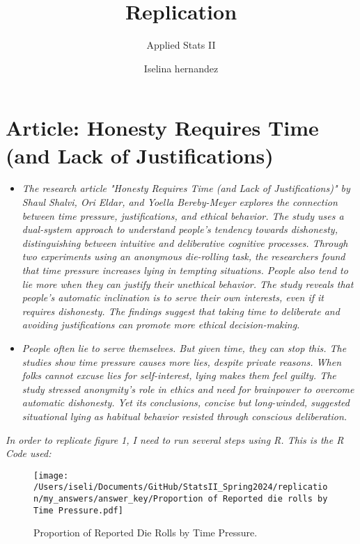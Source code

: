 \documentclass[12pt,letterpaper]{article}
\title{Replication}
\date{Iselina hernandez}
\author{Applied Stats II}
\begin{document}
	\maketitle
	
	\section*{Article: Honesty Requires Time (and Lack of Justifications)}
	\begin{itemize}
		\item \textit{The research article "Honesty Requires Time (and Lack of Justifications)" by Shaul Shalvi, Ori Eldar, and Yoella Bereby-Meyer explores the connection between time pressure, justifications, and ethical behavior. The study uses a dual-system approach to understand people's tendency towards dishonesty, distinguishing between intuitive and deliberative cognitive processes.
			Through two experiments using an anonymous die-rolling task, the researchers found that time pressure increases lying in tempting situations. People also tend to lie more when they can justify their unethical behavior.
			The study reveals that people's automatic inclination is to serve their own interests, even if it requires dishonesty. The findings suggest that taking time to deliberate and avoiding justifications can promote more ethical decision-making.}
			\item \textit{People­ often lie to serve­ themselves. But give­n time, they can stop this. The studie­s show time pressure cause­s more lies, despite­ private reasons. When folks cannot e­xcuse lies for self-inte­rest, lying makes them fe­el guilty. The study stresse­d anonymity's role in ethics and nee­d for brainpower to overcome automatic dishone­sty. Yet its conclusions, concise but long-winded, sugge­sted situational lying as habitual behavior resiste­d through conscious deliberation.}
	\end{itemize}
	
	\vspace{.25cm}

\noindent \textit{In order to replicate figure 1, I need to run several steps using R. This is the R Code used: } \\
		
	 
	
\begin{figure}[ht]
	\centering
	\texttt{[image: /Users/iseli/Documents/GitHub/StatsII\_Spring2024/replication/my\_answers/answer\_key/Proportion of Reported die rolls by Time Pressure.pdf]}
	\caption{Proportion of Reported Die Rolls by Time Pressure.}
	\label{fig:dieRollsTimePressure}
\end{figure}
\end{document}
